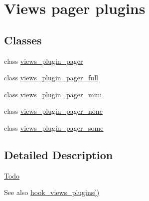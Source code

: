 \hypertarget{group__views__pager__plugins}{
\section{Views pager plugins}
\label{group__views__pager__plugins}
}
\subsection*{Classes}
\begin{DoxyCompactItemize}
\item 
class \hyperlink{classviews__plugin__pager}{views\_\-plugin\_\-pager}
\item 
class \hyperlink{classviews__plugin__pager__full}{views\_\-plugin\_\-pager\_\-full}
\item 
class \hyperlink{classviews__plugin__pager__mini}{views\_\-plugin\_\-pager\_\-mini}
\item 
class \hyperlink{classviews__plugin__pager__none}{views\_\-plugin\_\-pager\_\-none}
\item 
class \hyperlink{classviews__plugin__pager__some}{views\_\-plugin\_\-pager\_\-some}
\end{DoxyCompactItemize}


\subsection{Detailed Description}
\begin{Desc}
\item[\hyperlink{todo__todo000058}{Todo}]\end{Desc}
\begin{DoxySeeAlso}{See also}
\hyperlink{group__views__hooks_ga23f6e9972b2ed84fc54b7ff63f44477d}{hook\_\-views\_\-plugins()} 
\end{DoxySeeAlso}
